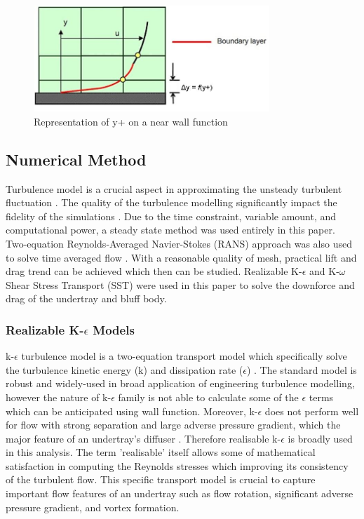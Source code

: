 \begin{figure}[!ht]
    \centering
    \includegraphics[height=4cm]{Figures/inflation_layer.jpg}
    \caption{Representation of y+ on a near wall function \cite{Anonymous2013Inflate4Blog}}
    \label{fig:inflation layer}
\end{figure}


\subsection{Numerical Method}
Turbulence model is a crucial aspect in approximating the unsteady turbulent fluctuation \cite{Cummings2015AppliedAerodynamics}. The quality of the turbulence modelling significantly impact the fidelity of the simulations \cite{Lanfrit2005BestFLUENT}. Due to the time constraint, variable amount, and computational power, a steady state method was used entirely in this paper. Two-equation Reynolds-Averaged Navier-Stokes (RANS) approach was also used to solve time averaged flow \cite{Cummings2015AppliedAerodynamics}. With a reasonable quality of mesh, practical lift and drag trend can be achieved which then can be studied. Realizable K-$\epsilon$ and K-$\omega$ Shear Stress Transport (SST) were used in this paper to solve the downforce and drag of the undertray and bluff body.  

\subsubsection{Realizable K-$\epsilon$  Models}
k-$\epsilon$  turbulence model is a  two-equation transport model which specifically solve the turbulence kinetic energy (k) and dissipation rate ($\epsilon$) \cite{Andersson2011Turbulent-flowModelling}\cite{Mansour1989Near-wallModeling}\cite{Ansys2006ModelingFlows}. The standard model is robust and widely-used in broad application of engineering turbulence modelling, however the nature of  k-$\epsilon$ family is not able to calculate some of the $\epsilon$ terms which can be anticipated using wall function. Moreover, k-$\epsilon$ does not perform well for flow with strong separation and large adverse pressure gradient, which the major feature of an undertray's diffuser \cite{Ansys2006ModelingFlows}.  Therefore realisable k-$\epsilon$ is broadly used in this analysis. The term 'realisable' itself allows some of mathematical satisfaction in computing the Reynolds stresses which improving its consistency of the turbulent flow. This specific transport model is crucial to capture important flow features of an undertray such as flow rotation, significant adverse pressure gradient, and vortex formation.

